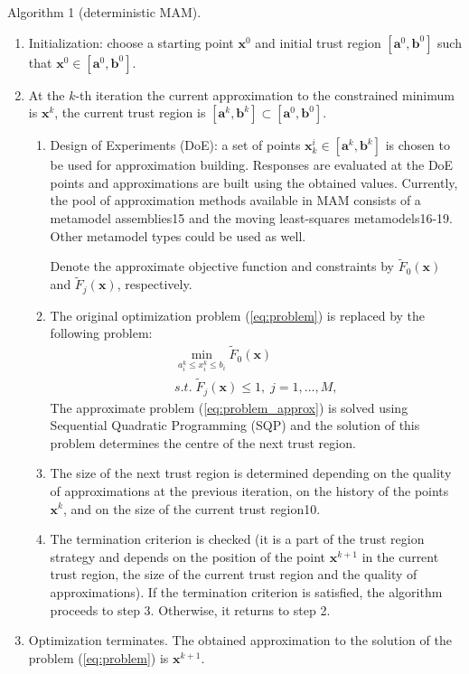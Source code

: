 \documentclass[10pt,twocolumn,a4paper]{article}
\begin{document}
Algorithm 1 (deterministic MAM).
\begin{enumerate}
\item Initialization: choose a starting point $\pmb x^0$ and initial trust region $[\pmb a^0, \pmb b^0]$ such that $\pmb x^0 \in [\pmb a^0, \pmb b^0]$.
\item At the $k$-th iteration the current approximation to the constrained minimum is $\pmb x^k$, the current trust region is $[\pmb a^k, \pmb b^k] \subset [\pmb a^0, \pmb b^0]$.
  \begin{enumerate}[label=(\alph*)]
    \item Design of Experiments (DoE): a set of points $\pmb x_k^i \in [\pmb a^k, \pmb b^k]$ is chosen to be used for approximation building. Responses are evaluated at the DoE points and approximations are built using the obtained values. Currently, the pool of approximation methods available in MAM consists of a metamodel assemblies15 and the moving least-squares metamodels16-19. Other metamodel types could be used as well.

    Denote the approximate objective function and constraints by $\widetilde{F}_0(\pmb x)$ and $\widetilde{F}_j(\pmb x)$, respectively.
    \item The original optimization problem (\ref{eq:problem}) is replaced by the following problem:
    \begin{equation}
      \label{eq:problem_approx}
      \begin{array}{c}
      \min_{a_i^k \le x_i ^k\le b_i}\widetilde{F}_0(\pmb x) \\
      s.t.\; \widetilde{F}_j(\pmb x) \le 1,\; j=1,\dots ,M,
      \end{array}
    \end{equation}
    The approximate problem (\ref{eq:problem_approx}) is solved using Sequential Quadratic Programming (SQP) and the solution of this problem   determines the centre of the next trust region.
    \item The size of the next trust region is determined depending on the quality of approximations at the previous iteration, on the history of the points $\pmb x^k$, and on the size of the current trust region10.
    \item The termination criterion is checked (it is a part of the trust region strategy and depends on the position of the point $\pmb x^{k+1}$ in the current trust region, the size of the current trust region and the quality of approximations). If the termination criterion is satisfied, the algorithm proceeds to step 3. Otherwise, it returns to step 2.
  \end{enumerate}
  \item Optimization terminates. The obtained approximation to the solution of the problem (\ref{eq:problem}) is $\pmb x^{k+1}$.
\end{enumerate}
\end{document}
